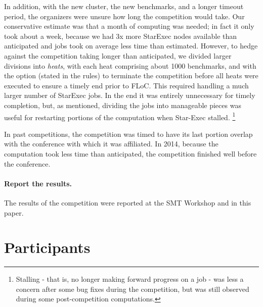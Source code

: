\documentclass[twoside,11pt]{article}
\begin{document}
In addition, with the new cluster, the new benchmarks, and a longer timeout period, the organizers were unsure how long the competition would take. Our conservative estimate was that a month of computing was needed; in fact it only took about a week, because we had 3x more StarExec nodes available than anticipated and jobs took on average less time than estimated. However, to hedge against the competition taking longer than anticipated, we divided larger divisions into \emph{heats}, with each heat comprising about 1000 benchmarks, and with the option (stated in the rules) to terminate the competition before all heats were executed to ensure a timely end prior to FLoC. This required handling a much larger number of StarExec jobs. In the end it was entirely unnecessary for timely completion, but, as mentioned, dividing the jobs into manageable pieces was useful for restarting portions of the computation when Star-Exec stalled.
\footnote{Stalling - that is, no longer making forward progress on a job - was less a concern after some bug fixes during the competition, but was still observed during some post-competition computations.}

In past competitions, the competition was timed to have its last portion overlap with the conference with which it was affiliated. In 2014, because the computation took less time than anticipated, the competition finished well before the conference.

\paragraph{Report the results.} The results of the competition were reported at the SMT Workshop and in this paper.

\section{Participants}
\label{sec:participants}
\end{document}
